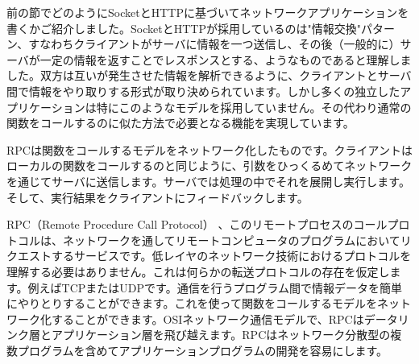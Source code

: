 前の節でどのようにSocketとHTTPに基づいてネットワークアプリケーションを書くかご紹介しました。SocketとHTTPが採用しているのは"情報交換"パターン、すなわちクライアントがサーバに情報を一つ送信し、その後（一般的に）サーバが一定の情報を返すことでレスポンスとする、ようなものであると理解しました。双方は互いが発生させた情報を解析できるように、クライアントとサーバ間で情報をやり取りする形式が取り決められています。しかし多くの独立したアプリケーションは特にこのようなモデルを採用していません。その代わり通常の関数をコールするのに似た方法で必要となる機能を実現しています。

RPCは関数をコールするモデルをネットワーク化したものです。クライアントはローカルの関数をコールするのと同じように、引数をひっくるめてネットワークを通じてサーバに送信します。サーバでは処理の中でそれを展開し実行します。そして、実行結果をクライアントにフィードバックします。

RPC（Remote Procedure Call Protocol） 、このリモートプロセスのコールプロトコルは、ネットワークを通してリモートコンピュータのプログラムにおいてリクエストするサービスです。低レイヤのネットワーク技術におけるプロトコルを理解する必要はありません。これは何らかの転送プロトコルの存在を仮定します。例えばTCPまたはUDPです。通信を行うプログラム間で情報データを簡単にやりとりすることができます。これを使って関数をコールするモデルをネットワーク化することができます。OSIネットワーク通信モデルで、RPCはデータリンク層とアプリケーション層を飛び越えます。RPCはネットワーク分散型の複数プログラムを含めてアプリケーションプログラムの開発を容易にします。
